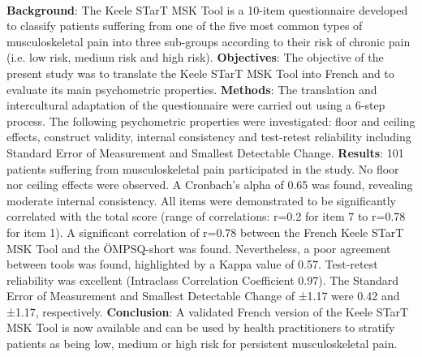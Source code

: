 \\
\textbf{Background}: The Keele STarT MSK Tool is a 10-item questionnaire developed to classify patients suffering from one of the five most common types of musculoskeletal pain into three sub-groups according to their risk of chronic pain (i.e. low risk, medium risk and high risk).
\textbf{Objectives}: The objective of the present study was to translate the Keele STarT MSK Tool into French and to evaluate its main psychometric properties.
\textbf{Methods}: The translation and intercultural adaptation of the questionnaire were carried out using a 6-step process. The following psychometric properties were investigated: floor and ceiling effects, construct validity, internal consistency and test-retest reliability including Standard Error of Measurement and Smallest Detectable Change. 
\textbf{Results}: 101 patients suffering from musculoskeletal pain participated in the study. No floor nor ceiling effects were observed. A Cronbach’s alpha of 0.65 was found, revealing moderate internal consistency. All items were demonstrated to be significantly correlated with the total score (range of correlations: r=0.2 for item 7 to r=0.78 for item 1). A significant correlation of r=0.78 between the French Keele STarT MSK Tool and the ÖMPSQ-short was found. Nevertheless, a poor agreement between tools was found, highlighted by a Kappa value of 0.57. Test-retest reliability was excellent (Intraclass Correlation Coefficient 0.97). The Standard Error of Measurement and Smallest Detectable Change of ±1.17 were 0.42 and ±1.17, respectively. \textbf{Conclusion}: A validated French version of the Keele STarT MSK Tool is now available and can be used by health practitioners to stratify patients as being low, medium or high risk for persistent musculoskeletal pain.  